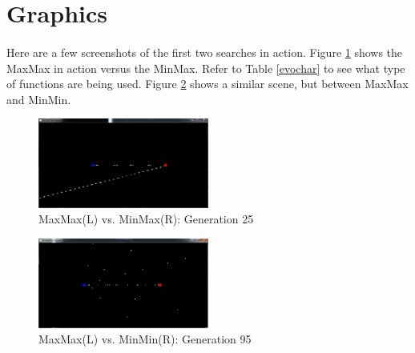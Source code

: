 \documentclass{acm_proc_article-sp}
\begin{document}
\appendix
\section{Graphics}

\paragraph{} Here are a few screenshots of the first two searches in action. Figure \ref{fig:pic} shows the MaxMax in action versus the MinMax. Refer to Table \ref{evochar} to see what type of functions are being used. Figure \ref{fig:pic2} shows a similar scene, but between MaxMax and MinMin.

\begin{figure}[H]
\centering
\caption{MaxMax(L) vs. MinMax(R): Generation 25}
\label{fig:pic}
\includegraphics[width=0.5\textwidth]{MaxMax(L)vMinMax(R)g-25}
\end{figure}

\begin{figure}[H]
\centering
\caption{MaxMax(L) vs. MinMin(R): Generation 95}
\label{fig:pic2}
\includegraphics[width=0.5\textwidth]{MaxMax(L)vMinMin(R)g-95}
\end{figure}

\end{document}
